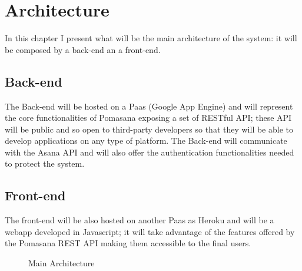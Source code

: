 



\chapter{Architecture}
\label{architectural_design}

In this chapter I present what will be the main architecture of the system: it will be composed by a back-end an a front-end.


	\section{Back-end}
	The Back-end will be hosted on a Paas (Google App Engine) and will represent the core functionalities of Pomasana exposing a set of RESTful API; these API will be public and so open to third-party developers so that they will be able to develop applications on any type of platform. The Back-end will communicate with the Asana API and will also offer the authentication functionalities needed to protect the system.

	\section{Front-end}
	The front-end will be also hosted on another Paas as Heroku and will be a webapp developed in Javascript; it will take advantage of the features offered by the Pomasana REST API making them accessible to the final users.



		\begin{figure}[h!]
		  \centering
		  \caption{Main Architecture}
		\end{figure}
